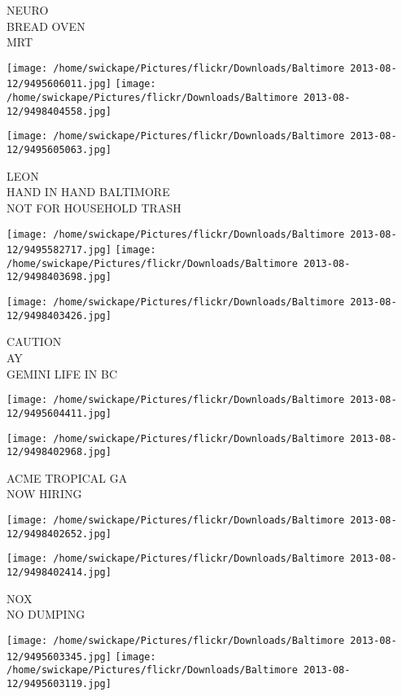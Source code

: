 \documentclass[10pt,letterpaper]{article}
\begin{document}
NEURO\\
BREAD OVEN\\
MRT\\
\pagebreak

\texttt{[image: /home/swickape/Pictures/flickr/Downloads/Baltimore 2013-08-12/9495606011.jpg]}
\texttt{[image: /home/swickape/Pictures/flickr/Downloads/Baltimore 2013-08-12/9498404558.jpg]}

\vspace{0.25in}
\texttt{[image: /home/swickape/Pictures/flickr/Downloads/Baltimore 2013-08-12/9495605063.jpg]}

LEON\\
HAND IN HAND BALTIMORE\\
NOT FOR HOUSEHOLD TRASH\\
\pagebreak

\texttt{[image: /home/swickape/Pictures/flickr/Downloads/Baltimore 2013-08-12/9495582717.jpg]}
\texttt{[image: /home/swickape/Pictures/flickr/Downloads/Baltimore 2013-08-12/9498403698.jpg]}

\texttt{[image: /home/swickape/Pictures/flickr/Downloads/Baltimore 2013-08-12/9498403426.jpg]}

CAUTION\\
AY\\
GEMINI LIFE IN BC\\
\pagebreak

\texttt{[image: /home/swickape/Pictures/flickr/Downloads/Baltimore 2013-08-12/9495604411.jpg]}

\vspace{0.25in}
\texttt{[image: /home/swickape/Pictures/flickr/Downloads/Baltimore 2013-08-12/9498402968.jpg]}

ACME TROPICAL GA\\
NOW HIRING\\
\pagebreak

\texttt{[image: /home/swickape/Pictures/flickr/Downloads/Baltimore 2013-08-12/9498402652.jpg]}

\vspace{0.25in}
\texttt{[image: /home/swickape/Pictures/flickr/Downloads/Baltimore 2013-08-12/9498402414.jpg]}

NOX\\
NO DUMPING\\
\pagebreak

\texttt{[image: /home/swickape/Pictures/flickr/Downloads/Baltimore 2013-08-12/9495603345.jpg]}
\texttt{[image: /home/swickape/Pictures/flickr/Downloads/Baltimore 2013-08-12/9495603119.jpg]}
\end{document}
